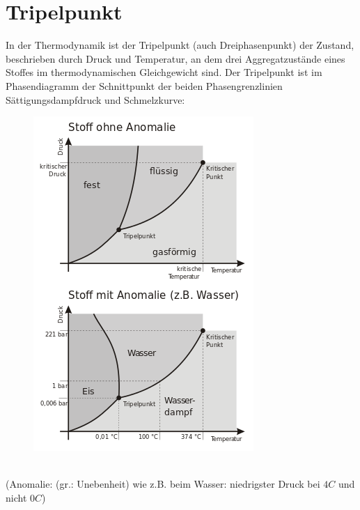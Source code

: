 \documentclass[10pt,a4paper]{article}
\begin{document}
\section{Tripelpunkt}
In der Thermodynamik ist der Tripelpunkt (auch Dreiphasenpunkt) der Zustand, beschrieben durch Druck und Temperatur, an dem drei Aggregatzustände eines Stoffes im thermodynamischen Gleichgewicht sind.
Der Tripelpunkt ist im Phasendiagramm der Schnittpunkt der beiden Phasengrenzlinien Sättigungsdampfdruck und Schmelzkurve:
\begin{figure}[hbtp]
\centering
\includegraphics[scale=0.6]{316px-Phasendiagramme.png}
\end{figure} \\
(Anomalie: (gr.: Unebenheit) wie z.B. beim Wasser: niedrigster Druck bei $4 C$ und nicht $0 C$)
\end{document}
